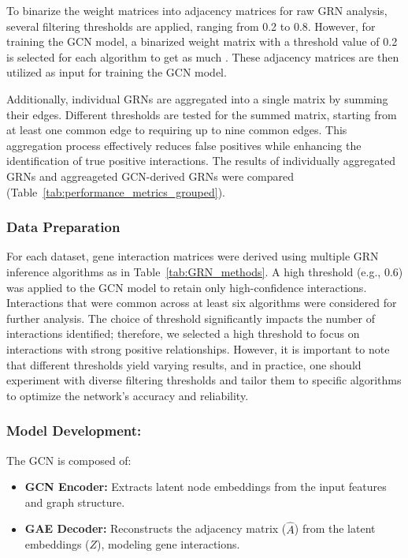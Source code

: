 \documentclass{article}
\newcounter{subsubsubsection}[subsubsection]
\begin{document}
To binarize the weight matrices into adjacency matrices for raw GRN analysis, several filtering thresholds are applied, ranging from 0.2 to 0.8. However, for training the GCN model, a binarized weight matrix with a threshold value of 0.2 is selected for each algorithm to get as much . These adjacency matrices are then utilized as input for training the GCN model.

Additionally, individual GRNs are aggregated into a single matrix by summing their edges. Different thresholds are tested for the summed matrix, starting from at least one common edge to requiring up to nine common edges. This aggregation process effectively reduces false positives while enhancing the identification of true positive interactions. The results of individually aggregated GRNs and aggreageted GCN-derived GRNs were compared (Table~\ref{tab:performance_metrics_grouped}).

\subsubsection{Data Preparation}
For each dataset, gene interaction matrices were derived using multiple GRN inference algorithms as in Table~\ref{tab:GRN_methods}. A high threshold (e.g., 0.6) was applied to the GCN model to retain only high-confidence interactions. Interactions that were common across at least six algorithms were considered for further analysis. The choice of threshold significantly impacts the number of interactions identified; therefore, we selected a high threshold to focus on interactions with strong positive relationships. However, it is important to note that different thresholds yield varying results, and in practice, one should experiment with diverse filtering thresholds and tailor them to specific algorithms to optimize the network's accuracy and reliability.

\subsubsection{Model Development:}


The GCN is composed of:
\begin{itemize}
    \item \textbf{GCN Encoder:} Extracts latent node embeddings from the input features and graph structure.
    \item \textbf{GAE Decoder:} Reconstructs the adjacency matrix (\(\hat{A}\)) from the latent embeddings (\(Z\)), modeling gene interactions.
\end{itemize}
\end{document}
